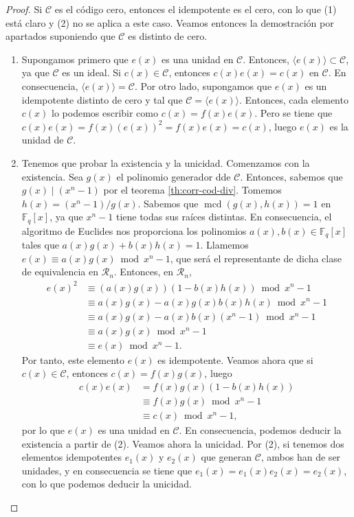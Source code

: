 \begin{proof}
  Si \(\mathcal C\) es el código cero, entonces el idempotente es el cero, con lo que (1) está claro y (2) no se aplica a este caso. 
  Veamos entonces la demostración por apartados suponiendo que \(\mathcal C\) es distinto de cero.
  \begin{enumerate}
    \item Supongamos primero que \(e(x)\) es una unidad en \(\mathcal C\). 
    Entonces, \(\langle e(x)\rangle \subset \mathcal C\), ya que \(\mathcal C\) es un ideal.
    Si \(c(x) \in \mathcal C\), entonces \(c(x)e(x) = c(x)\) en \(\mathcal C\).
    En consecuencia, \(\langle e(x)\rangle = \mathcal C\).
    Por otro lado, supongamos que \(e(x)\) es un idempotente distinto de cero y tal que \(\mathcal C = \langle e(x)\rangle\).
    Entonces, cada elemento \(c(x)\) lo podemos escribir como \(c(x) = f(x)e(x)\).
    Pero se tiene que \(c(x)e(x) = f(x)(e(x))^2 = f(x)e(x) = c(x)\), luego \(e(x)\) es la unidad de \(\mathcal C\).
    \item Tenemos que probar la existencia y la unicidad.
    Comenzamos con la existencia.
    Sea \(g(x)\) el polinomio generador dde \(\mathcal C\).
    Entonces, sabemos que \(g(x) \mid (x^n - 1)\) por el teorema \ref{th:corr-cod-div}.
    Tomemos \(h(x) = (x^n - 1)/g(x)\).
    Sabemos que \(\operatorname{mcd}(g(x), h(x)) = 1\) en \(\mathbb F_q[x]\), ya que \(x^n - 1\) tiene todas sus raíces distintas.
    En consecuencia, el algoritmo de Euclides nos proporciona los polinomios \(a(x),b(x) \in \mathbb F_q[x]\) tales que \(a(x)g(x) + b(x)h(x) = 1\).
    Llamemos \(e(x) \equiv a(x)g(x) \bmod x^n - 1\), que será el representante de dicha clase de equivalencia en \(\mathcal R_n\).
    Entonces, en \(\mathcal R_n\),
    \begin{align*}
      e(x)^2 &\equiv (a(x)g(x))(1 - b(x)h(x)) \bmod x^n - 1\\
        &\equiv a(x)g(x) - a(x)g(x)b(x)h(x) \bmod x^n - 1\\
        &\equiv a(x)g(x) - a(x)b(x)(x^n - 1) \bmod x^n - 1\\
        &\equiv a(x)g(x) \bmod x^n - 1\\
        &\equiv e(x) \bmod x^n - 1.
    \end{align*}
    Por tanto, este elemento \(e(x)\) es idempotente.
    Veamos ahora que si \(c(x) \in \mathcal C\), entonces \(c(x) = f(x)g(x)\), luego
    \begin{align*}
      c(x)e(x) &= f(x)g(x)(1 - b(x)h(x))\\
        &\equiv f(x)g(x) \bmod x^n - 1\\
        &\equiv c(x) \bmod x^n - 1,
    \end{align*}
    por lo que \(e(x)\) es una unidad en \(\mathcal C\).
    En consecuencia, podemos deducir la existencia a partir de (2).
    Veamos ahora la unicidad. Por (2), si tenemos dos elementos idempotentes \(e_1(x)\) y \(e_2(x)\) que generan \(\mathcal C\), ambos han de ser unidades, y en consecuencia se tiene que \(e_1(x) = e_1(x)e_2(x) = e_2(x)\), con lo que podemos deducir la unicidad.\qedhere
  \end{enumerate}
\end{proof}

